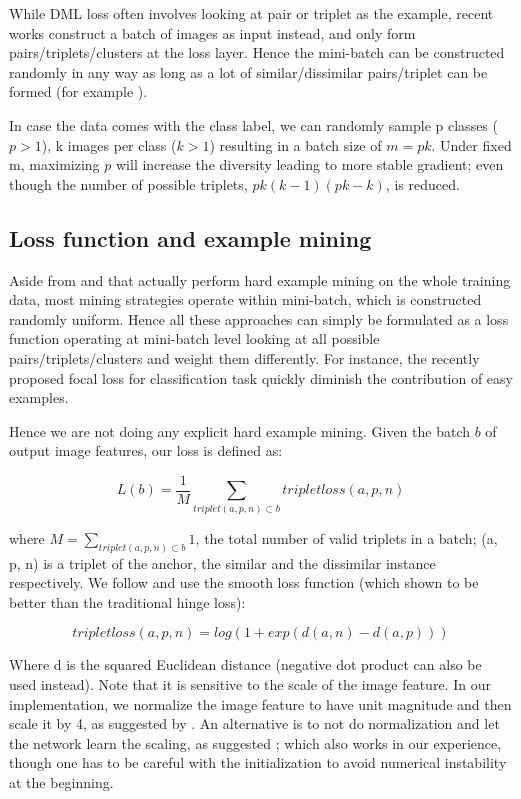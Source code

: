 \documentclass[10pt,twocolumn,letterpaper]{article}
\begin{document}
While DML loss often involves looking at pair or triplet as the example, recent works construct a batch of images as input instead, and only form pairs/triplets/clusters at the loss layer. Hence the mini-batch can be constructed randomly in any way as long as a lot of similar/dissimilar pairs/triplet can be formed (for example \cite{vo2016localizing, sohn2016improved}).

In case the data comes with the class label, we can randomly sample p classes ($p>1$), k images per class ($k>1$) resulting in a batch size of $m=pk$. Under fixed m, maximizing $p$ will increase the diversity leading to more stable gradient; even though the number of possible triplets, $pk(k-1)(pk-k)$, is reduced.

\subsection{Loss function and example mining}
Aside from \cite{radenovic2016cnn} and \cite{kumar2017smart} that actually perform hard example mining on the whole training data, most mining strategies operate within mini-batch, which is constructed randomly uniform. Hence all these approaches can simply be formulated as a loss function operating at mini-batch level looking at all possible pairs/triplets/clusters and weight them differently. For instance, the recently proposed focal loss for classification task \cite{lin2017focal} quickly diminish the contribution of easy examples.

Hence we are not doing any explicit hard example mining.
Given the batch $b$ of output image features, our loss is defined as:

$$L(b) = \frac{1}{M} \sum_{triplet (a,p,n) \subset b}^{} tripletloss(a, p, n)$$

where $M = \sum_{triplet (a,p,n) \subset b}^{} 1$, the total number of valid triplets in a batch; (a, p, n) is a triplet of the anchor, the similar and the dissimilar instance respectively. We follow \cite{vo2016localizing, sohn2016improved, hermans2017defense} and use the smooth loss function (which shown to be better than the traditional hinge loss):

$$tripletloss(a, p, n) = log(1 + exp(d(a,n) - d(a,p)))$$


Where d is the squared Euclidean distance (negative dot product can also be used instead). Note that it is sensitive to the scale of the image feature. In our implementation, we normalize the image feature to have unit magnitude and then scale it by 4, as suggested by \cite{vo2016localizing}. An alternative is to not do normalization and let the network learn the scaling, as suggested \cite{hermans2017defense}; which also works in our experience, though one has to be careful with the initialization to avoid numerical instability at the beginning.
\end{document}
